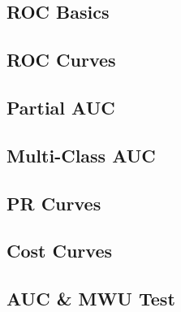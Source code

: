 \subsection{ROC Basics}


\subsection{ROC Curves}


\subsection{Partial AUC}


\subsection{Multi-Class AUC}


\subsection{PR Curves}


\subsection{Cost Curves}


\subsection{AUC \& MWU Test}

